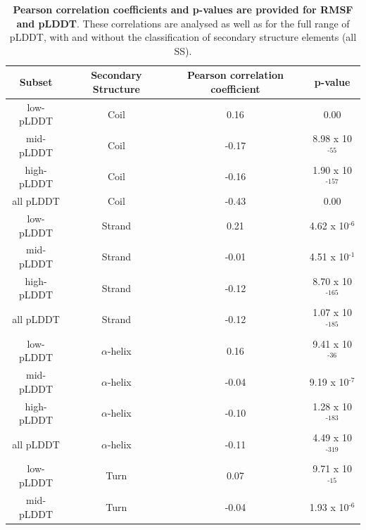 \begin{table}[H]
\centering
\small
\caption{\textbf{Pearson correlation coefficients and p-values are provided for RMSF and pLDDT}. These correlations are analysed as well as for the full range of pLDDT, with and without the classification of secondary structure elements (all SS).}
\label{tab:plddt_sup:suptable7}
\begin{tabular}{cccc}
\toprule
\multicolumn{1}{c}{Subset} & \multicolumn{1}{c}{Secondary Structure} & \multicolumn{1}{c}{Pearson correlation coefficient} & \multicolumn{1}{c}{p-value}  \\ 
\midrule
low-pLDDT& Coil                & 0.16                        & 0.00                         \\
mid-pLDDT& Coil                & -0.17                       & 8.98 x 10$^{\text{-55}}$     \\
high-pLDDT& Coil                & -0.16                       & 1.90 x 10$^{\text{-157}}$    \\
all pLDDT& Coil                & -0.43                       & 0.00                         \\
\arrayrulecolor[gray]{0.8}\hline
low-pLDDT
& Strand              & 0.21                        & 4.62 x 10$^{\text{-6}}$      \\
mid-pLDDT
& Strand              & -0.01                       & 4.51 x 10$^{\text{-1}}$      \\
high-pLDDT
& Strand              & -0.12                       & 8.70 x 10$^{\text{-165}}$     \\
all pLDDT& Strand              & -0.12                       & 1.07 x 10$^{\text{-185}}$    \\
\arrayrulecolor[gray]{0.8}\hline
low-pLDDT
& $\alpha$-helix      & 0.16                        & 9.41 x 10$^{\text{-36}}$     \\
mid-pLDDT
& $\alpha$-helix      & -0.04                       & 9.19 x 10$^{\text{-7}}$      \\
high-pLDDT
& $\alpha$-helix      & -0.10                       & 1.28 x 10$^{\text{-183}}$    \\
all pLDDT& $\alpha$-helix      & -0.11                       & 4.49 x 10$^{\text{-319}}$    \\
\arrayrulecolor[gray]{0.8}\hline
low-pLDDT
& Turn                & 0.07                        & 9.71 x 10$^{\text{-15}}$     \\
mid-pLDDT
& Turn                & -0.04                       & 1.93 x 10$^{\text{-6}}$      \\

\end{tabular}
\end{table}
